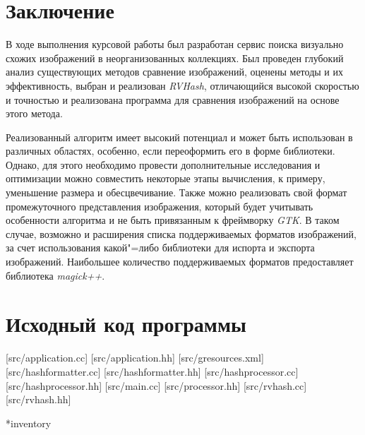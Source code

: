 \documentclass[variant=courcework]{bsuir}
\begin{document}






\chapter*{Заключение}

В ходе выполнения курсовой работы был разработан сервис поиска визуально схожих
изображений в неорганизованных коллекциях. Был проведен глубокий анализ
существующих методов сравнение изображений, оценены методы и их эффективность,
выбран и реализован \textit{RVHash}, отличающийся высокой скоростью и точностью
и реализована программа для сравнения изображений на основе этого метода.

Реализованный алгоритм имеет высокий потенциал и может быть использован в
различных областях, особенно, если переоформить его в форме библиотеки. Однако,
для этого необходимо провести дополнительные исследования и оптимизации можно
совместить некоторые этапы вычисления, к примеру, уменьшение размера и
обесцвечивание. Также можно реализовать свой формат промежуточного представления
изображения, который будет учитывать особенности алгоритма и не быть привязанным
к фреймворку \textit{GTK}. В таком случае, возможно и расширения списка
поддерживаемых форматов изображений, за счет использования какой"=либо
библиотеки для испорта и экспорта изображений. Наибольшее количество
поддерживаемых форматов предоставляет библиотека \textit{magick++}.



\chapter[обязательное]{Исходный код программы}

[src/application.cc]
[src/application.hh]
[src/gresources.xml]
[src/hashformatter.cc]
[src/hashformatter.hh]
[src/hashprocessor.cc]
[src/hashprocessor.hh]
[src/main.cc]
[src/processor.hh]
[src/rvhash.cc]
[src/rvhash.hh]

*{inventory}
\end{document}
